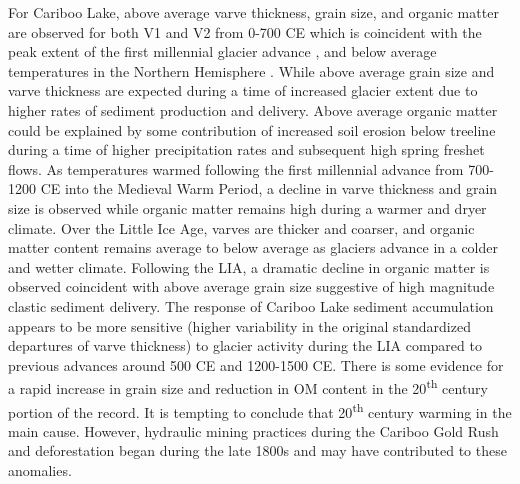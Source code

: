 \documentclass[Royal,times,doublespace,sageh]{sagej}
\begin{document}
For Cariboo Lake, above average varve thickness, grain size, and organic
matter are observed for both V1 and V2 from 0-700 CE which is coincident
with the peak extent of the first millennial glacier advance
\citep{Solomina2016}, and below average temperatures in the Northern
Hemisphere \citep{Ljungqvist2016}. While above average grain size and
varve thickness are expected during a time of increased glacier extent
due to higher rates of sediment production and delivery. Above average
organic matter could be explained by some contribution of increased soil
erosion below treeline during a time of higher precipitation rates and
subsequent high spring freshet flows. As temperatures warmed following
the first millennial advance from 700-1200 CE into the Medieval Warm
Period, a decline in varve thickness and grain size is observed while
organic matter remains high during a warmer and dryer climate. Over the
Little Ice Age, varves are thicker and coarser, and organic matter
content remains average to below average as glaciers advance in a colder
and wetter climate. Following the LIA, a dramatic decline in organic
matter is observed coincident with above average grain size suggestive
of high magnitude clastic sediment delivery. The response of Cariboo
Lake sediment accumulation appears to be more sensitive (higher
variability in the original standardized departures of varve thickness)
to glacier activity during the LIA compared to previous advances around
500 CE and 1200-1500 CE. There is some evidence for a rapid increase in
grain size and reduction in OM content in the 20\textsuperscript{th}
century portion of the record. It is tempting to conclude that
20\textsuperscript{th} century warming in the main cause. However,
hydraulic mining practices during the Cariboo Gold Rush and
deforestation began during the late 1800s and may have contributed to
these anomalies.
\end{document}

